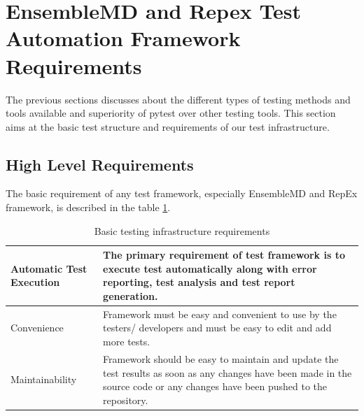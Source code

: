 \documentclass[10pt]{ruthesis}
\begin{document}
\section{EnsembleMD and Repex Test Automation Framework Requirements}
The previous sections discusses about the different types of testing methods and tools available and superiority of pytest over other testing tools. This section aims at the basic test structure and requirements of our test infrastructure.

\subsection{High Level Requirements}
The basic requirement of any test framework, especially EnsembleMD and RepEx framework, is described in the table \ref{table1}.

\begin{table}
\begin{center}
\def\arraystretch{2}
\begin{tabular}{|l| p{10cm}|}
\hline
Automatic Test Execution & The primary requirement of test framework is to execute test automatically along with error reporting, test analysis and test report generation. \\ 
\hline
Convenience & Framework must be easy and convenient to use by the testers/ developers and must be easy to edit and add more tests. \\ 
\hline
Maintainability & Framework should be easy to maintain and update the test results as soon as any changes have been made in the source code or any changes have been pushed to the repository.\\ 
\hline
\end{tabular}
\end{center}
\caption{Basic testing infrastructure requirements}
\label{table1}
\end{table}
\end{document}

